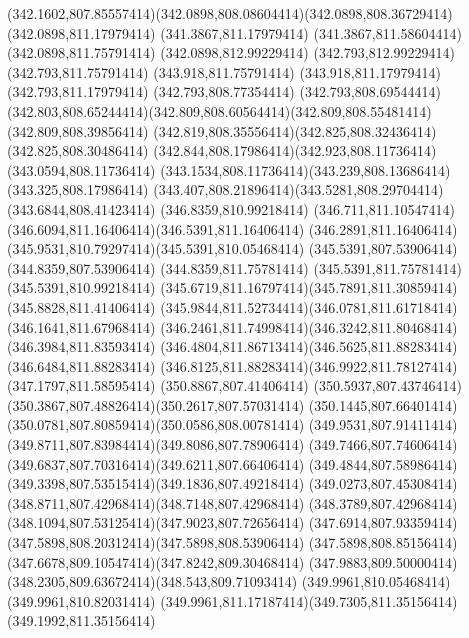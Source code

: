 {{	\curveto(342.1602,807.85557414)(342.0898,808.08604414)(342.0898,808.36729414)
	\lineto(342.0898,811.17979414)
	\lineto(341.3867,811.17979414)
	\lineto(341.3867,811.58604414)
	\lineto(342.0898,811.75791414)
	\lineto(342.0898,812.99229414)
	\lineto(342.793,812.99229414)
	\lineto(342.793,811.75791414)
	\lineto(343.918,811.75791414)
	\lineto(343.918,811.17979414)
	\lineto(342.793,811.17979414)
	\lineto(342.793,808.77354414)
	\lineto(342.793,808.69544414)
	\curveto(342.803,808.65244414)(342.809,808.60564414)(342.809,808.55481414)
	\lineto(342.809,808.39856414)
	\curveto(342.819,808.35556414)(342.825,808.32436414)(342.825,808.30486414)
	\curveto(342.844,808.17986414)(342.923,808.11736414)(343.0594,808.11736414)
	\curveto(343.1534,808.11736414)(343.239,808.13686414)(343.325,808.17986414)
	\curveto(343.407,808.21896414)(343.5281,808.29704414)(343.6844,808.41423414)
	\closepath
	\moveto(346.8359,810.99218414)
	\curveto(346.711,811.10547414)(346.6094,811.16406414)(346.5391,811.16406414)
	\curveto(346.2891,811.16406414)(345.9531,810.79297414)(345.5391,810.05468414)
	\lineto(345.5391,807.53906414)
	\lineto(344.8359,807.53906414)
	\lineto(344.8359,811.75781414)
	\lineto(345.5391,811.75781414)
	\lineto(345.5391,810.99218414)
	\curveto(345.6719,811.16797414)(345.7891,811.30859414)(345.8828,811.41406414)
	\curveto(345.9844,811.52734414)(346.0781,811.61718414)(346.1641,811.67968414)
	\curveto(346.2461,811.74998414)(346.3242,811.80468414)(346.3984,811.83593414)
	\curveto(346.4804,811.86713414)(346.5625,811.88283414)(346.6484,811.88283414)
	\curveto(346.8125,811.88283414)(346.9922,811.78127414)(347.1797,811.58595414)
	\closepath
	\moveto(350.8867,807.41406414)
	\curveto(350.5937,807.43746414)(350.3867,807.48826414)(350.2617,807.57031414)
	\curveto(350.1445,807.66401414)(350.0781,807.80859414)(350.0586,808.00781414)
	\curveto(349.9531,807.91411414)(349.8711,807.83984414)(349.8086,807.78906414)
	\curveto(349.7466,807.74606414)(349.6837,807.70316414)(349.6211,807.66406414)
	\curveto(349.4844,807.58986414)(349.3398,807.53515414)(349.1836,807.49218414)
	\curveto(349.0273,807.45308414)(348.8711,807.42968414)(348.7148,807.42968414)
	\curveto(348.3789,807.42968414)(348.1094,807.53125414)(347.9023,807.72656414)
	\curveto(347.6914,807.93359414)(347.5898,808.20312414)(347.5898,808.53906414)
	\curveto(347.5898,808.85156414)(347.6678,809.10547414)(347.8242,809.30468414)
	\curveto(347.9883,809.50000414)(348.2305,809.63672414)(348.543,809.71093414)
	\lineto(349.9961,810.05468414)
	\lineto(349.9961,810.82031414)
	\curveto(349.9961,811.17187414)(349.7305,811.35156414)(349.1992,811.35156414)
}}
